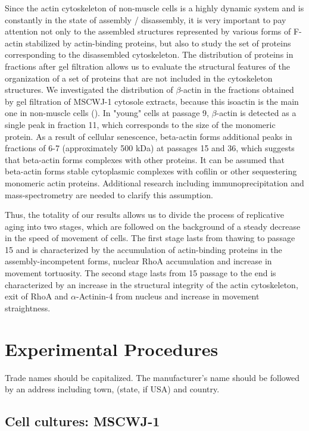 \documentclass[alpha-refs]{wiley-article}
\begin{document}
Since the actin cytoskeleton of non-muscle cells is a highly dynamic system and is constantly in the state of assembly / disassembly, it is very important to pay attention not only to the assembled structures represented by various forms of F-actin stabilized by actin-binding proteins, but also to study the set of proteins corresponding to the disassembled cytoskeleton.
The distribution of proteins in fractions after gel filtration allows us to evaluate the structural features of the organization of a set of proteins that are not included in the cytoskeleton structures.
We investigated the distribution of $\beta$-actin in the fractions obtained by gel filtration of MSCWJ-1 cytosole extracts, because this isoactin is the main one in non-muscle cells (\cite{khaitlina2001functional}).
In "young" cells at passage 9, $\beta$-actin is detected as a single peak in fraction 11, which corresponds to the size of the monomeric protein.
As a result of cellular senescence, beta-actin forms additional peaks in fractions of 6-7 (approximately 500 kDa) at passages 15 and 36, which suggests that beta-actin forms complexes with other proteins.
It can be assumed that beta-actin forms stable cytoplasmic complexes with cofilin or other sequestering monomeric actin proteins.
Additional research including immunoprecipitation and mass-spectrometry are needed to clarify this assumption.

Thus, the totality of our results allows us to divide the process of replicative aging into two stages, which are followed on the background of a steady decrease in the speed of movement of cells.
The first stage lasts from thawing to passage 15 and is characterized by the accumulation of actin-binding proteins in the assembly-incompetent forms, nuclear RhoA accumulation and increase in movement tortuosity.
The second stage lasts from 15 passage to the end is characterized by an increase in the structural integrity of the actin cytoskeleton, exit of RhoA and $\alpha$-Actinin-4 from nucleus and increase in movement straightness.

\section{Experimental Procedures}

Trade names should be capitalized. The manufacturer's name should be followed by an address including town, (state, if USA) and country.

\subsection{Cell cultures: MSCWJ-1}
\end{document}
